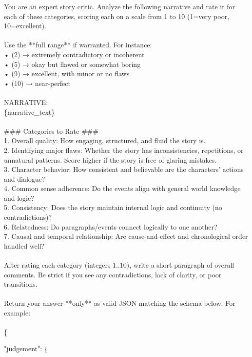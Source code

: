 \documentclass[11pt]{article}
\begin{document}
\begin{small}
\begin{tcolorbox}[colback=gray!10, colframe=gray!40, arc=4mm, boxrule=0pt]
You are an expert story critic. Analyze the following narrative and rate it for each of these categories, scoring each on a scale from 1 to 10 (1=very poor, 10=excellent). \\ 
\\
Use the **full range** if warranted. For instance:\\
 • (2) → extremely contradictory or incoherent \\
 • (5) → okay but flawed or somewhat boring\\
 • (9) → excellent, with minor or no flaws\\
 • (10) → near-perfect\\
\\
NARRATIVE:\\
\{narrative\_text\}\\
\\
\#\#\# Categories to Rate \#\#\#\\
1. Overall quality: How engaging, structured, and fluid the story is.\\
2. Identifying major flaws: Whether the story has inconsistencies, repetitions, or unnatural patterns. Score higher if the story is free of glaring mistakes.\\
3. Character behavior: How consistent and believable are the characters’ actions and dialogue?\\
4. Common sense adherence: Do the events align with general world knowledge and logic?\\
5. Consistency: Does the story maintain internal logic and continuity (no contradictions)?\\
6. Relatedness: Do paragraphs/events connect logically to one another?\\
7. Causal and temporal relationship: Are cause-and-effect and chronological order handled well?\\
\\
After rating each category (integers 1..10), write a short paragraph of overall comments. Be strict if you see any contradictions, lack of clarity, or poor transitions.\\
\\
Return your answer **only** as valid JSON matching the schema below. For example:\\
\\
\{
\par\hspace{1em}"judgement": \{

\end{tcolorbox}
\end{small}
\end{document}
